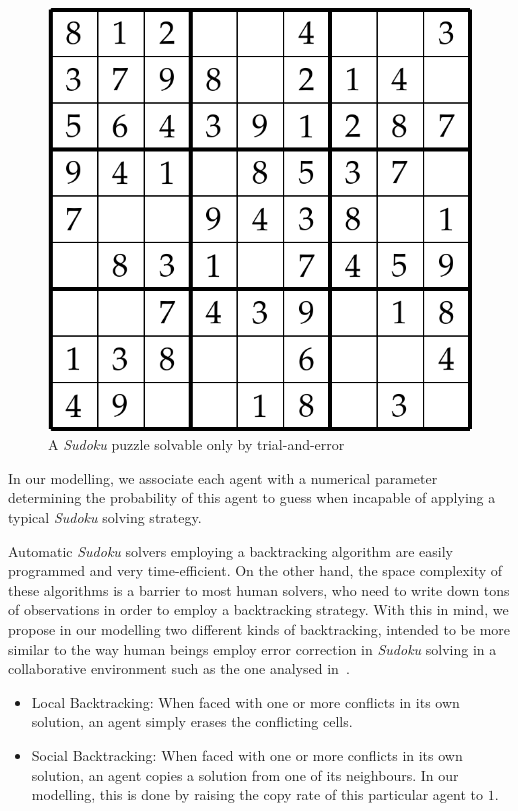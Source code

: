 \documentclass[letterpaper]{article}
\begin{document}
\begin{figure}
\centering
\includegraphics[scale=0.30]{trial_and_error_sudoku}
\caption{A {\em Sudoku} puzzle solvable only by trial-and-error}
\label{fig:trial_and_error_sudoku}
\end{figure}

In our modelling, we associate each agent with a numerical parameter determining the probability of this agent to guess when incapable of applying a typical {\em Sudoku} solving strategy.

Automatic {\em Sudoku} solvers employing a backtracking algorithm are easily programmed and very time-efficient. On the other hand, the space complexity of these algorithms is a barrier to most human solvers, who need to write down tons of observations in order to employ a backtracking strategy. With this in mind, we propose in our modelling two different kinds of backtracking, intended to be more similar to the way human beings employ error correction in {\em Sudoku} solving in a collaborative environment such as the one analysed in~\cite{farenzena:collabem}.

\begin{itemize}

\item
Local Backtracking: When faced with one or more conflicts in its own solution, an agent simply erases the conflicting cells.
\item
Social Backtracking: When faced with one or more conflicts in its own solution, an agent copies a solution from one of its neighbours. In our modelling, this is done by raising the copy rate of this particular agent to $1$.

\end{itemize}
\end{document}
